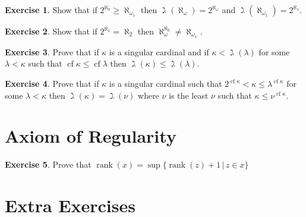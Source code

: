 \documentclass{article}
\theoremstyle{definition}
\newtheorem{exer}{Exercise}[section]
\DeclareMathOperator{\rank}{rank}
\DeclareMathOperator{\cf}{cf}
\newlength{\defparindent}
\newenvironment{answer}
    {\begin{mdframed}[backgroundcolor=gray!15, linewidth=0pt] \setlength{\parindent}{\defparindent}}
    {\end{mdframed}}
\begin{document}
\begin{exer}
    Show that if $2^{\aleph_0} \ge \aleph_{\omega_1}$ then $\gimel(\aleph_\omega) = 2^{\aleph_\omega}$ and $\gimel(\aleph_{\omega_1}) = 2^{\aleph_1}$.
    \begin{answer}

    \end{answer} 
\end{exer}

\begin{exer}
    Show that if $2^{\aleph_1} = \aleph_2$ then $\aleph_{\omega}^{\aleph_0} \ne \aleph_{\omega_1}$. 
\end{exer}

\begin{exer}
    Prove that if $\kappa$ is a singular cardinal and if $\kappa < \gimel(\lambda)$ for some $\lambda < \kappa$ such that $\cf \kappa \le \cf \lambda$ then $\gimel(\kappa) \le \gimel(\lambda)$.
\end{exer}

\begin{exer}
    Prove that if $\kappa$ is a singular cardinal such that $2^{\cf \kappa} < \kappa \le \lambda^{\cf \kappa}$ for some $\lambda < \kappa$ then $\gimel(\kappa) = \gimel(\nu)$ where $\nu$ is the least $\nu$ such that $\kappa \le \nu^{\cf \kappa}$.
\end{exer}

\section{Axiom of Regularity}

\begin{exer}
    Prove that $\rank(x) = \sup \{ \rank(z) + 1 \, | \, z \in x \}$

    \begin{answer}
    \end{answer}
\end{exer}

\section{Extra Exercises}
\end{document}
